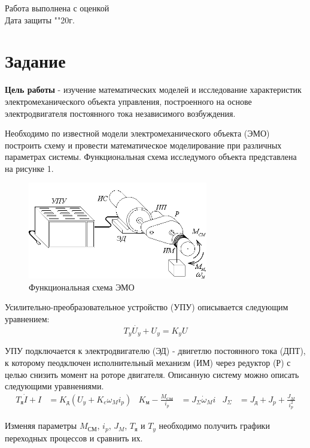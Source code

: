 \documentclass[a4paper, 12pt]{article}
\begin{document}
\begin{titlepage}
	Работа выполнена с оценкой \hspace{1cm} \underline{\hspace{8cm}} \\ 
	\vspace{1cm}
	Дата защиты "\underline{\hspace{0.7cm}}"\hspace{0.2cm}\underline{\hspace{2cm}}\hspace{0.2cm}20\underline{\hspace{0.7cm}}г.
	
\end{titlepage}


\section*{\centering Задание}
\textbf{Цель работы} - изучение математических моделей и исследование характеристик электромеханического объекта управления, построенного на основе электродвигателя постоянного тока независимого возбуждения. \par
Необходимо по известной модели электромеханического объекта (ЭМО) построить схему и провести математическое моделирование при различных параметрах системы. Функциональная схема исследумого объекта представлена на рисунке 1.
\begin{figure} [h!]
    \centering
    \includegraphics[width = 0.7\textwidth]{images/EMO.png}
    \caption{Функциональная схема ЭМО}
\end{figure} \par
Усилительно-преобразовательное устройство (УПУ) описывается следующим уравнением:
\begin{equation}
    T_y\dot{U_y} + U_y = K_yU
\end{equation} \par
УПУ подключается к электродвигателю (ЭД) - двигетлю постоянного тока (ДПТ), к которому пеодключен исполнительный механизм (ИМ) через редуктор (Р) с целью снизить момент на роторе двигателя. Описанную систему можно описать следующими уравнениями.
\begin{align}
    T_\text{я}\dot{I} + I & = K_\text{д}(U_y + K_e\omega_Mi_p) &
    K_\text{м} - \frac{M_\text{СМ}}{i_p} & = J_\Sigma\dot{\omega}_Mi &
    J_\Sigma & = J_\text{д} + J_p + \frac{J_M}{i_p^2}
\end{align} \par
Изменяя параметры $M_\text{СМ}$, $i_p$, $J_M$, $T_\text{я}$ и $T_y$ необходимо получить графики переходных процессов и сравнить их.
\end{document}
